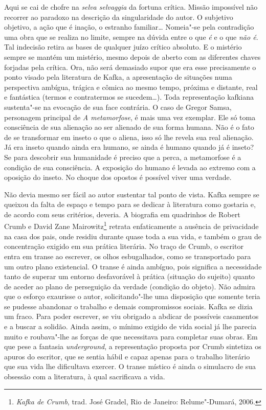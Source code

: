 Aqui se cai de chofre na \textit{selva selvaggia} da fortuna crítica.
Missão impossível não recorrer ao paradoxo na descrição da
singularidade do autor. O subjetivo objetivo, a ação que é inação, o
estranho familiar\ldots{} Nomeia"-se pela contradição uma obra que se
realiza no limite, sempre na dúvida entre o que \textit{é} e o que
\textit{não é}. Tal indecisão retira as bases de qualquer juízo crítico
absoluto. E o mistério sempre se mantém um mistério, mesmo depois de
aberto com as diferentes chaves forjadas pela crítica. Ora, não será
demasiado supor que era esse precisamente o ponto visado pela
literatura de Kafka, a apresentação de situações numa perspectiva
ambígua, trágica e cômica ao mesmo tempo, próxima e distante, real e
fantástica (termos e contratermos se sucedem\ldots{}). Toda representação
kafkiana sustenta"-se na evocação de sua face contrária. O caso de Gregor
Samsa, personagem principal de \textit{A metamorfose}, é mais uma vez
exemplar. Ele só toma consciência de sua alienação ao ser alienado de
sua forma humana. Não é o fato de se transformar em inseto o que o
aliena, isso só lhe revela sua real alienação. Já era inseto quando
ainda era humano, se ainda é humano quando já é inseto? 
Se para descobrir sua humanidade é
preciso que a perca, a metamorfose é a condição de sua consciência. A
exposição do humano é levada ao extremo com a oposição do inseto. No
choque dos opostos é possível viver uma verdade.

Não devia mesmo ser fácil ao autor sustentar tal ponto de vista. Kafka
sempre se queixou da falta de espaço e tempo para se dedicar à
literatura como gostaria e, de acordo com seus critérios, deveria. A
biografia em quadrinhos de Robert Crumb e David Zane
Mairowitz\footnote{ \textit{Kafka de Crumb}, trad. José Gradel, Rio de
Janeiro: Relume"-Dumará, 2006.} retrata enfaticamente a ausência de
privacidade na casa dos pais, onde residiu durante quase toda a sua
vida, e também o grau de concentração exigido em sua prática literária.
No traço de Crumb, o escritor entra em transe ao escrever, os olhos
esbugalhados, como se transportado para um outro plano existencial. O
transe é ainda ambíguo, pois significa a necessidade tanto de superar
um entorno desfavorável à prática (situação do sujeito) quanto de
aceder ao plano de perseguição da verdade (condição do objeto). Não
admira que o esforço exaurisse o autor, solicitando"-lhe uma
disposição que somente teria se pudesse abandonar o trabalho e demais
compromissos sociais. Kafka se dizia um fraco. Para poder escrever, se
viu obrigado a abdicar de possíveis casamentos e a buscar a solidão.
Ainda assim, o mínimo exigido de vida social já lhe parecia muito e
roubava"-lhe as forças de que necessitava para completar suas obras.
Em que pese a fantasia \textit{underground}, a representação proposta
por Crumb sintetiza os apuros do escritor, que se sentia hábil e capaz
apenas para o trabalho literário que sua vida lhe dificultava exercer.
O transe místico é ainda o simulacro de sua obsessão com a literatura,
à qual sacrificava a vida.

